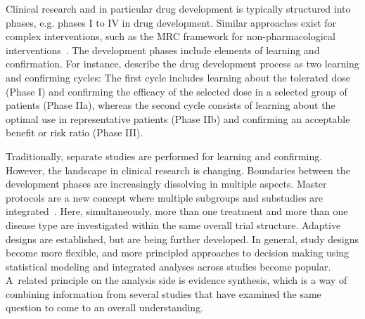 \documentclass[bimj,fleqn]{w-art}
\theoremstyle{plain}
\theoremstyle{definition}
\begin{document}
Clinical research and in particular drug development is typically structured into phases, e.g. phases I to IV in drug development. 
Similar approaches exist for complex interventions, such as the MRC framework for non-pharmacological interventions~\citep{campbell_framework_2000}.
The development phases include elements of learning and confirmation.
For instance, \citet{sheiner_learning_1997} describe the drug development process as two learning and confirming cycles:
The first cycle includes learning about the tolerated dose (Phase I) and confirming the efficacy of the selected dose in a selected group of patients (Phase IIa), whereas the second cycle consists of learning about the optimal use in representative patients (Phase IIb) and confirming an acceptable benefit or risk ratio (Phase III).

Traditionally, separate studies are performed for learning and confirming.
However, the landscape in clinical research is changing.
Boundaries between the development phases are increasingly dissolving in multiple aspects.
Master protocols are a new concept where multiple subgroups and substudies are integrated~\citep{bogin_master_2020}.
Here, simultaneously, more than one treatment and more than one disease type are investigated within the same overall trial structure.
Adaptive designs are established, but are being further developed.
In general, study designs become more flexible, and more principled approaches to decision making using statistical modeling and integrated analyses across studies become popular. 
A~related principle on the analysis side is evidence synthesis, which is a way of combining information from several studies that have examined the same question to come to an overall understanding.
\end{document}
